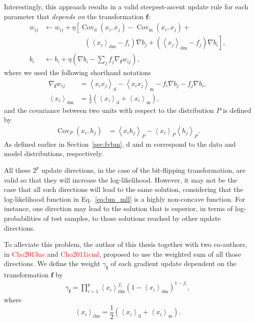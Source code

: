 \documentclass{now}
\newcommand{\qexp}[1]{\left<#1\right>}
\newcommand{\vect}[1]{\mathbf{#1}}
\newcommand{\cov}[0]{\operatorname{Cov}}
\newcommand{\vf}[0]{\vect{f}}
\newcommand{\td}[0]{\text{d}}
\newcommand{\tf}[0]{\text{m}}
\newcommand{\tdf}[0]{\text{dm}}
\newcommand{\alert}[1]{\textcolor{red}{#1}}
\newcommand{\citepub}[1]{\alert{#1}}
\begin{document}
Interestingly, this approach results in a valid
steepest-ascent update rule for each parameter that
\textit{depends on} the transformation $\vf$:
\begin{align}
  w_{ij} &\leftarrow  w_{ij} + \eta
  \left[\cov_\td(x_i,x_j)-\cov_\tf(x_i,x_j) + \right.
  \nonumber \\
  &\phantom{\leftarrow w_{ij} + \eta
  \left[\right]}\left.\left(\left<x_i\right>_\tdf-f_i\right)
  \nabla b_j + \left(\left<x_j\right>_\tdf-f_j\right) \nabla
  b_i \right], 
\label{eq:threestepW}
\\
 b_i &\leftarrow  b_i + \eta\left( \nabla b_i - \sum_j f_j \nabla_\vf
      w_{ij} \right),
\label{eq:threestepb}
\end{align}
where we used the following shorthand notations
\begin{align*}
\nabla_\vf w_{ij} &= \left<x_ix_j\right>_\td -
\left<x_ix_j\right>_\tf - f_i\nabla b_j - f_j \nabla b_i, \\
\left< x_i \right>_{\tdf} &= \frac{1}{2} \left( \left< x_i
\right>_{\td} + \left< x_i \right>_{\tf} \right),
\end{align*}
and the covariance between two units with respect to the
distribution $P$ is defined by
\begin{align*}
  \cov_P\left(x_i, h_j\right) &= \qexp{x_i h_j}_P
   -\qexp{x_i}_P \qexp{h_j}_P.
\end{align*}
As defined earlier in Section~\ref{sec:fvbm}, $\td$ and
$\tf$ correspond to the data and model distributions,
respectively. 

All these $2^p$ update directions, in the case of
the bit-flipping transformation, are valid so that they will
increase the log-likelihood. However, it may not be the case
that all such directions will lead to the same solution,
considering that the log-likelihood function in
Eq.~\eqref{eq:bm_mll} is a highly non-concave function. For
instance, one direction may lead to the solution that is
superior, in terms of log-probabilities of test samples, to
those solutions reached by other update directions.

To alleviate this problem, the author of this thesis
together with two co-authors, in \citepub{Cho2013nc} and
\citepub{Cho2011icml}, proposed to use the weighted sum of
all those directions. We define the weight $\gamma_{\vf}$ of
each gradient update dependent on the transformation $\vf$
by
\begin{align*}
    \gamma_{\vf}  = \prod_{i=1}^p \left< x_i
    \right>_{\tdf}^{f_i} \left(1 - \left< x_i
    \right>_{\tdf}\right)^{1 - f_i},
\end{align*}
where 
\[
\left< x_i \right>_{\tdf} = \frac{1}{2} \left( \left< x_i
\right>_{\td} + \left< x_i \right>_{\tf}\right).
\]
\end{document}
